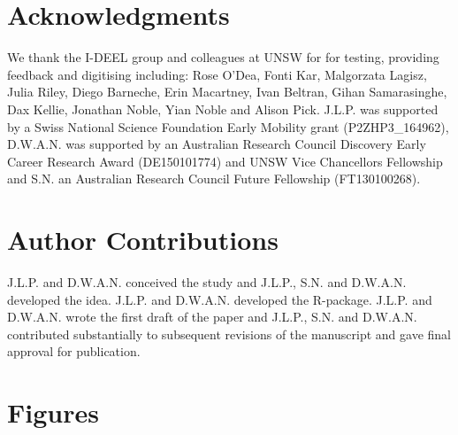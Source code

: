 \documentclass[12pt]{article}
\begin{document}
\section*{Acknowledgments}
We thank the I-DEEL group and colleagues at UNSW for for testing, providing feedback and digitising including: Rose O'Dea, Fonti Kar, Malgorzata Lagisz, Julia Riley, Diego Barneche, Erin Macartney, Ivan Beltran, Gihan Samarasinghe, Dax Kellie, Jonathan Noble, Yian Noble and Alison Pick. J.L.P. was supported by a Swiss National Science Foundation Early Mobility grant (P2ZHP3\_164962), D.W.A.N. was supported by an Australian Research Council Discovery Early Career Research Award (DE150101774) and UNSW Vice Chancellors Fellowship and S.N. an Australian Research Council Future Fellowship (FT130100268). 

\section*{Author Contributions}
J.L.P. and D.W.A.N. conceived the study and J.L.P., S.N. and D.W.A.N. developed the idea. J.L.P. and D.W.A.N. developed the R-package. J.L.P. and D.W.A.N. wrote the first draft of the paper and J.L.P., S.N. and D.W.A.N. contributed substantially to subsequent revisions of the manuscript and gave final approval for publication.





\clearpage
\section*{Figures}
\end{document}
